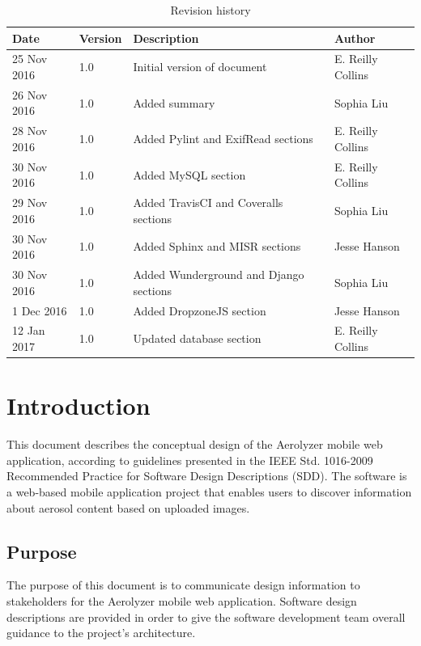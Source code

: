 \documentclass[onecolumn, draftclsnofoot,10pt, compsoc]{IEEEtran}
\begin{document}
\begin{flushleft}
\begin{table}[h!]
\caption{Revision history}\label{table:1}
\centering
\begin{tabular}{| p{2cm} | p{2cm} | p{5cm} | p{3cm} |}
\hline
\textbf{Date} & \textbf{Version} & \textbf{Description} & \textbf{Author} \\
\hline
25 Nov 2016 & 1.0 & Initial version of document & E. Reilly Collins\\
\hline
26 Nov 2016 & 1.0 & Added summary & Sophia Liu\\
\hline
28 Nov 2016 & 1.0 & Added Pylint and ExifRead sections & E. Reilly Collins\\
\hline
30 Nov 2016 & 1.0 & Added MySQL section & E. Reilly Collins\\
\hline
29 Nov 2016 & 1.0 & Added TravisCI and Coveralls sections & Sophia Liu\\
\hline
30 Nov 2016 & 1.0 & Added Sphinx and MISR sections & Jesse Hanson\\
\hline
30 Nov 2016 & 1.0 & Added Wunderground and Django sections & Sophia Liu\\
\hline
1 Dec 2016 & 1.0 & Added DropzoneJS section & Jesse Hanson\\
\hline
12 Jan 2017 & 1.0 & Updated database section & E. Reilly Collins\\
\hline
\end{tabular}
\end{table}

\clearpage
\section{Introduction} 
This document describes the conceptual design of the Aerolyzer mobile web application, according to guidelines presented in the IEEE Std. 1016-2009 Recommended Practice for Software Design Descriptions (SDD). The software is a web-based mobile application project that enables users to discover information about aerosol content based on uploaded images.

\subsection{Purpose }
The purpose of this document is to communicate design information to stakeholders for the Aerolyzer mobile web application. Software design descriptions are provided in order to give the software development team overall guidance to the project’s architecture. 


\end{flushleft}
\end{document}
